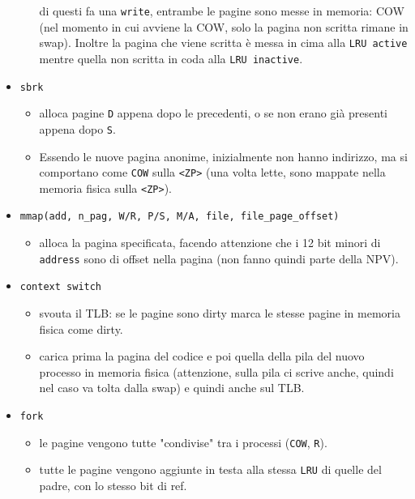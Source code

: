 \documentclass[12pt, a4paper]{report}
\begin{document}
\begin{itemize}
\begin{itemize}
		            di questi fa una \texttt{write}, entrambe le pagine sono
		            messe in memoria: COW (nel momento in cui avviene la COW,
		            solo la pagina non scritta rimane in swap). Inoltre la
		            pagina che viene scritta è messa in cima alla \texttt{LRU
			            active} mentre quella non scritta in coda alla \texttt{LRU
			            inactive}. \end{itemize}
	\item \texttt{sbrk}
	      \begin{itemize}
		      \item alloca pagine \texttt{D} appena dopo le precedenti, o se non
		            erano già presenti appena dopo \texttt{S}.
		      \item Essendo le nuove pagina anonime, inizialmente non hanno
		            indirizzo, ma si comportano come \texttt{COW} sulla
		            \texttt{<ZP>} (una volta lette, sono mappate nella memoria
		            fisica sulla \texttt{<ZP>}).
	      \end{itemize}
	\item \texttt{mmap(add, n\_pag, W/R, P/S, M/A, file, file\_page\_offset)}
	      \begin{itemize}
		      \item alloca la pagina specificata, facendo attenzione che i 12
		            bit minori di \texttt{address} sono di offset nella pagina
		            (non fanno quindi parte della NPV).
	      \end{itemize}
	\item \texttt{context switch}
	      \begin{itemize}
		      \item svouta il TLB: se le pagine sono dirty marca le stesse pagine
		            in memoria fisica come dirty.
		      \item carica prima la pagina del codice e poi quella della pila del
		            nuovo processo in memoria fisica (attenzione, sulla pila ci
		            scrive anche, quindi nel caso va tolta dalla swap) e quindi
		            anche sul TLB. \end{itemize}
	\item \texttt{fork}
	      \begin{itemize}
		      \item le pagine vengono tutte "condivise" tra i processi
		            (\texttt{COW}, \texttt{R}).
		      \item tutte le pagine vengono aggiunte in testa alla stessa
		            \texttt{LRU} di quelle del padre, con lo stesso bit di ref.

\end{itemize}
\end{itemize}
\end{document}
